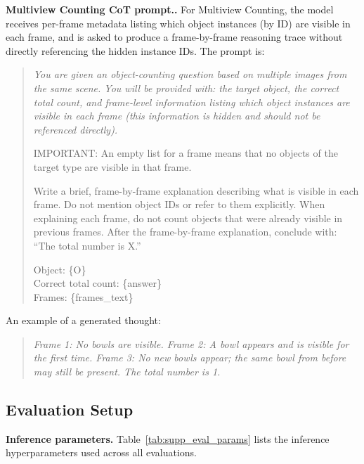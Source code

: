 \documentclass{llmxive}
\providecommand{\paragraph}[1]{\vspace{.5em}\noindent\textbf{#1.}}
\begin{document}
\paragraph{Multiview Counting CoT prompt.}
For Multiview Counting, the model receives per-frame metadata listing which object instances (by ID) are visible in each frame, and is asked to produce a frame-by-frame reasoning trace without directly referencing the hidden instance IDs. The prompt is:
 
\begin{quote}\small\itshape
You are given an object-counting question based on multiple images from the same scene. You will be provided with: the target object, the correct total count, and frame-level information listing which object instances are visible in each frame (this information is hidden and should not be referenced directly).
 
\smallskip
\noindent IMPORTANT: An empty list for a frame means that no objects of the target type are visible in that frame.
 
\smallskip
\noindent Write a brief, frame-by-frame explanation describing what is visible in each frame. Do not mention object IDs or refer to them explicitly. When explaining each frame, do not count objects that were already visible in previous frames.  After the frame-by-frame explanation, conclude with: ``The total number is X.''
 
\smallskip
\noindent Object: \{O\}\\
Correct total count: \{answer\}\\
Frames: \{frames\_text\}
\end{quote}


 \noindent An example of a generated thought:
\begin{quote}\small\itshape
Frame 1: No bowls are visible.  Frame 2: A bowl appears and is visible for the first time.  Frame 3: No new bowls appear; the same bowl from before may still be present. The total number is 1.
\end{quote}
 



\subsection{Evaluation Setup}
\label{supp_eval}

\noindent\textbf{Inference parameters.}
Table~\ref{tab:supp_eval_params} lists the inference hyperparameters used across all evaluations.
\end{document}
